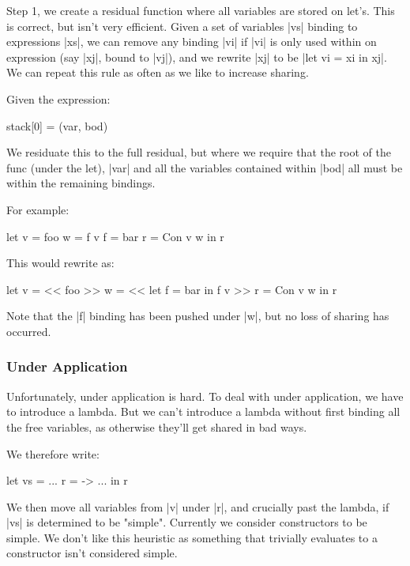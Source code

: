 \documentclass{sigplanconf}
\begin{document}
Step 1, we create a residual function where all variables are stored on let's. This is correct, but isn't very efficient. Given a set of variables |vs| binding to expressions |xs|, we can remove any binding |vi| if |vi| is only used within on expression (say |xj|, bound to |vj|), and we rewrite |xj| to be |let vi = xi in xj|. We can repeat this rule as often as we like to increase sharing.

Given the expression:

\begin{code}
stack[0] = (var, bod)
\end{code}

We residuate this to the full residual, but where we require that the root of the func (under the let), |var| and all the variables contained within |bod| all must be within the remaining bindings.

For example:

\begin{code}
let v = foo
    w = f v
    f = bar
    r = Con v w
in r
\end{code}

This would rewrite as:

\begin{code}
let v = << foo >>
    w = << let f = bar in f v >>
    r = Con v w
in r
\end{code}

Note that the |f| binding has been pushed under |w|, but no loss of sharing has occurred.

\subsubsection{Under Application}

Unfortunately, under application is hard. To deal with under application, we have to introduce a lambda. But we can't introduce a lambda without first binding all the free variables, as otherwise they'll get shared in bad ways.

We therefore write:

\begin{code}
let vs  = ...
    r  = \x -> ...
in r
\end{code}

We then move all variables from |v| under |r|, and crucially past the lambda, if |vs| is determined to be "simple". Currently we consider constructors to be simple. We don't like this heuristic as something that trivially evaluates to a constructor isn't considered simple.
\end{document}
